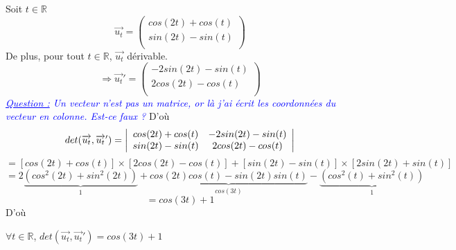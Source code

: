Soit $t \in \mathbb{R}$
\[
  \overrightarrow{u_{t}} =
  \left(
  \begin{array}{c}
      cos(2t) + cos(t) \\
      sin(2t) - sin(t) \\
    \end{array}
  \right)
\]
De plus, pour tout $t\in \mathbb{R}$, $\overrightarrow{u_t}$ dérivable.
\[
  \Rightarrow \overrightarrow{u_{t}}' =
  \left(
  \begin{array}{c}
      -2sin(2t) - sin(t) \\
      2cos(2t) - cos(t)  \\
    \end{array}
  \right)
\]
\textcolor{Blue}{\textit{\ul{Question :} Un vecteur n'est pas un matrice, or là j'ai écrit les coordonnées du vecteur en colonne. Est-ce faux ?}}
\newline
D'où
\[
  det(\overrightarrow{u_{t}}, \overrightarrow{u_{t}}') =
  \left|
  \begin{array}{c c}
    cos(2t) + cos(t) & -2sin(2t) - sin(t) \\
    sin(2t) - sin(t) & 2cos(2t) - cos(t)  \\
  \end{array}
  \right|
\]
\[
  = \left[cos(2t) + cos(t)\right] \times
  \left[2cos(2t) - cos(t)\right] +
  \left[sin(2t) - sin(t)\right] \times
  \left[2sin(2t) + sin(t)\right]
\]
\[
  = 2
  \underbrace{\left(cos^2(2t) + sin^2(2t)\right)
  }_{1} +
  \underbrace{cos(2t)cos(t) - sin(2t)sin(t)
  }_{cos(3t)} -
  \underbrace{\left(cos^2(t) + sin^2(t)\right)
  }_{1}
\]
\[
  = cos(3t) + 1
\]
D'où
\begin{result}
  $\forall t \in \mathbb{R}$, $det(\overrightarrow{u_{t}}, \overrightarrow{u_{t}}') = cos(3t) + 1$
\end{result}
